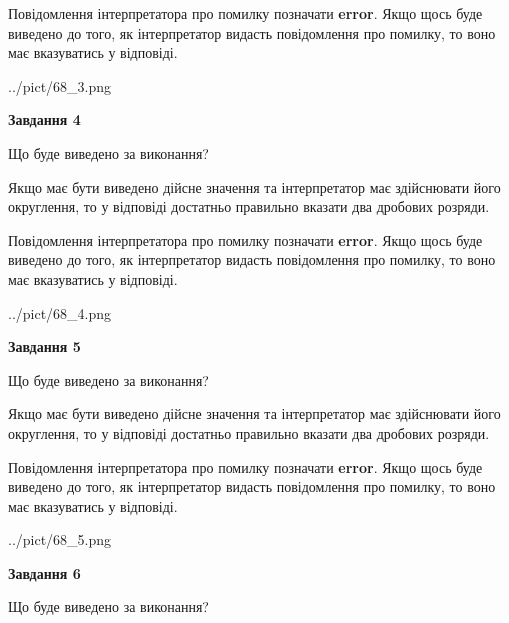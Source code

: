 \documentclass[12pt, ukrainian]{article}
\begin{document}
{\begin {Large}
Повідомлення інтерпретатора про помилку позначати \textbf{error}.
Якщо щось буде виведено до того, як інтерпретатор видасть повідомлення про помилку, 
то воно має вказуватись у відповіді. \par

\begin{center}
	{../pict/68_3.png}
\end{center}
\newpage

{\begin {center}\textbf{Завдання 4}\end {center}}\par
Що буде виведено за виконання? \par

Якщо має бути виведено дійсне значення та інтерпретатор має здійснювати його округлення, 
то у відповіді достатньо правильно вказати два дробових розряди.

Повідомлення інтерпретатора про помилку позначати \textbf{error}.
Якщо щось буде виведено до того, як інтерпретатор видасть повідомлення про помилку, 
то воно має вказуватись у відповіді. \par

\begin{center}
	{../pict/68_4.png}
\end{center}
\newpage

{\begin {center}\textbf{Завдання 5}\end {center}}\par
Що буде виведено за виконання? \par

Якщо має бути виведено дійсне значення та інтерпретатор має здійснювати його округлення, 
то у відповіді достатньо правильно вказати два дробових розряди.

Повідомлення інтерпретатора про помилку позначати \textbf{error}.
Якщо щось буде виведено до того, як інтерпретатор видасть повідомлення про помилку, 
то воно має вказуватись у відповіді. \par

\begin{center}
	{../pict/68_5.png}
\end{center}
\newpage

{\begin {center}\textbf{Завдання 6}\end {center}}\par
Що буде виведено за виконання? \par


\end{Large}}
\end{document}
